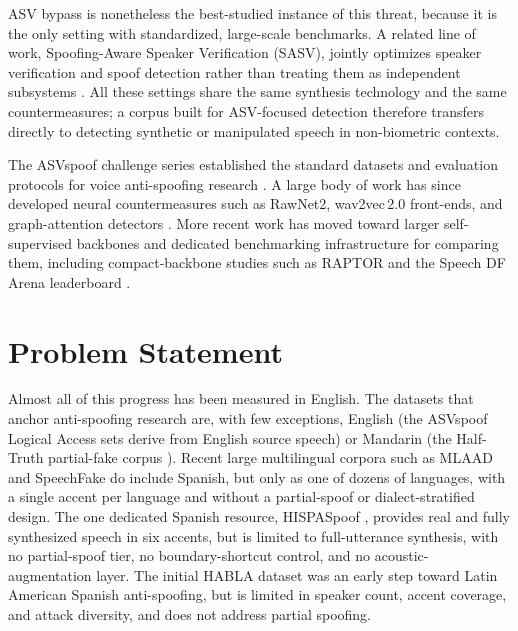 \documentclass[11pt]{report}
\begin{document}
ASV bypass is nonetheless the best-studied instance of this
threat, because it is the only setting with standardized, large-scale
benchmarks. A related line of work, Spoofing-Aware Speaker Verification
(SASV), jointly optimizes speaker verification and spoof detection rather
than treating them as independent subsystems
\citep{sasvevalplan2022,sasv2022,Wu2026wildspoof}. All these settings share
the same synthesis technology and the same countermeasures; a corpus
built for ASV-focused detection therefore transfers directly to detecting synthetic
or manipulated speech in non-biometric contexts.

The ASVspoof challenge series established the standard datasets and
evaluation protocols for voice anti-spoofing research
\citep{asvspoof2019,asvspoof2021,asvspoof5}. A large body of work has
since developed neural countermeasures such as RawNet2, wav2vec\,2.0
front-ends, and graph-attention detectors \citep{rawnet2,tak2022ssl,aasist}.
More recent work has moved toward larger self-supervised backbones
\citep{vasquez2026wildspoof} and dedicated benchmarking infrastructure for
comparing them, including compact-backbone studies such as RAPTOR
\citep{raptor2026} and the Speech DF Arena leaderboard
\citep{dowerah2025speechdfarena}.

\section{Problem Statement}

Almost all of this progress has been measured in English. The datasets
that anchor anti-spoofing research are, with few exceptions, English (the
ASVspoof Logical Access sets derive from English source speech) or
Mandarin (the Half-Truth partial-fake corpus \citep{yi2021had}). Recent
large multilingual corpora such as MLAAD \citep{mlaad} and SpeechFake
\citep{speechfake} do include Spanish, but only as one of dozens of
languages, with a single accent per language and without a partial-spoof
or dialect-stratified design. The one dedicated Spanish resource,
HISPASpoof \citep{hispaspoof}, provides real and fully synthesized speech
in six accents, but is limited to full-utterance synthesis, with no
partial-spoof tier, no boundary-shortcut control, and no
acoustic-augmentation layer. The initial HABLA dataset \citep{habla} was
an early step toward Latin American Spanish anti-spoofing, but is limited
in speaker count, accent coverage, and attack diversity, and does not
address partial spoofing.
\end{document}
